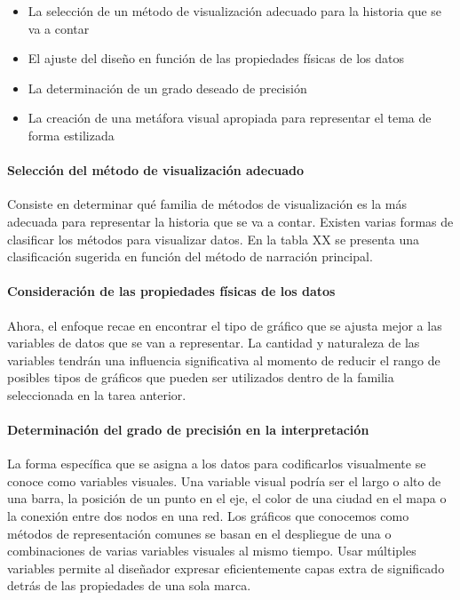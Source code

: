 \begin{itemize}
  \item La selección de un método de visualización adecuado para la historia que se va a contar
  \item El ajuste del diseño en función de las propiedades físicas de los datos
  \item La determinación de un grado deseado de precisión
  \item La creación de una metáfora visual apropiada para representar el tema de forma estilizada
\end{itemize}

\paragraph{Selección del método de visualización adecuado}

Consiste en determinar qué familia de métodos de visualización es la más adecuada para representar la historia que se va a contar. Existen varias formas de clasificar los métodos para visualizar datos. En la tabla XX se presenta una clasificación sugerida en función del método de narración principal.

\paragraph{Consideración de las propiedades físicas de los datos}

Ahora, el enfoque recae en encontrar el tipo de gráfico que se ajusta mejor a las variables de datos que se van a representar. La cantidad y naturaleza de las variables tendrán una influencia significativa al momento de reducir el rango de posibles tipos de gráficos que pueden ser utilizados dentro de la familia seleccionada en la tarea anterior.

\paragraph{Determinación del grado de precisión en la interpretación}

La forma específica que se asigna a los datos para codificarlos visualmente se conoce como variables visuales. Una variable visual podría ser el largo o alto de una barra, la posición de un punto en el eje, el color de una ciudad en el mapa o la conexión entre dos nodos en una red. Los gráficos que conocemos como métodos de representación comunes se basan en el despliegue de una o combinaciones de varias variables visuales al mismo tiempo. Usar múltiples variables permite al diseñador expresar eficientemente capas extra de significado detrás de las propiedades de una sola marca. 


